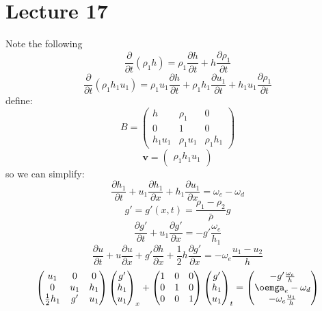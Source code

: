 \documentclass{article}
\begin{document}
         \section{Lecture 17}
         Note the following
         $$
          \frac{\partial}{\partial t} ( \rho_1 h) = \rho_1 \frac{\partial h}{\partial t} + h \frac{\partial \rho_1}{\partial t}
         $$
         $$
         \frac{\partial}{\partial t}( \rho_1 h_1 u_1) = \rho _1 u_1 \frac{\partial h}{\partial t} + \rho_1 h_1 \frac{\partial u_1}{\partial t} + h_1 u_1 \frac{\partial \rho_1}{\partial t} 
         $$
         define:
         $$
          B = \begin{pmatrix} h & \rho_1 & 0\\
                  0 & 1 & 0 \\
          h_1u_1 & \rho_1 u_1 & \rho_1 h_1 \end{pmatrix}
         $$
         $$
         \bm v =
         \begin{pmatrix}
                 \rho_1 h_1 u_1
         \end{pmatrix}
         $$
         so we can simplify:
         $$
          \frac{\partial h_1}{\partial t} + u_1 \frac{\partial h_1}{\partial x} + h_1 \frac{\partial u_1}{\partial x} = \omega_e - \omega_d
         $$
         $$
          g' = g'(x,t) = \frac{\rho_1 - \rho_2}{\bar \rho} g
         $$
         $$
          \frac{\partial g'}{\partial t} + u_1 \frac{\partial g'}{\partial x} = -g' \frac{\omega_e}{h_1}
         $$
         $$
          \frac{\partial u}{\partial t} + u \frac{\partial u}{\partial x} + g' \frac{\partial h}{\partial x} + \frac{1}{2} h \frac{\partial g'}{\partial x} = - \omega_e \frac{u_1 - u_2}{h}
         $$
         $$
          \begin{pmatrix}
                  u_1 & 0 & 0\\
                  0 & u_1 & h_1 \\ \frac{1}{2} h_1 & g' & u_1 \end{pmatrix} \begin{pmatrix} g'\\ h_1 \\ u_1 \end{pmatrix}_x + \begin{pmatrix} 1 & 0 & 0\\ 0 & 1 & 0 \\ 0 & 0 & 1 \end{pmatrix} \begin{pmatrix} g' \\ h_1 \\ u_1 \end{pmatrix}_t = \begin{pmatrix} - g' \frac{\omega_e}{h}\\ \oemga_e - \omega_d \\ - \omega_e \frac{u_1}{h} \end{pmatrix}
         $$
\end{document}
